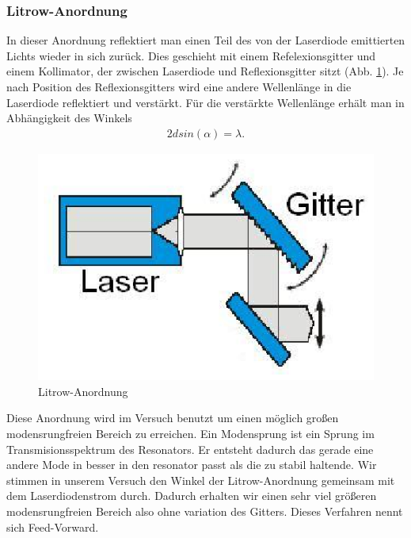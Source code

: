 \documentclass[12pt]{article}
\begin{document}
\subsubsection{Litrow-Anordnung}
In dieser Anordnung reflektiert man einen Teil des von der Laserdiode emittierten Lichts wieder in sich zurück. Dies geschieht mit einem Refelexionsgitter und einem Kollimator, der zwischen Laserdiode und Reflexionsgitter sitzt (Abb. \ref{litrow}). Je nach Position des Reflexionsgitters wird eine andere Wellenlänge in die Laserdiode reflektiert und verstärkt. Für die verstärkte Wellenlänge erhält man in Abhängigkeit des Winkels
\begin{align}
\label{litrowpeak}
 2d sin(\alpha) = \lambda.
\end{align}
\begin{figure}[H]
 \includegraphics[width=0.9\linewidth]{pictures/litrow.eps}
 \caption{Litrow-Anordnung}
 \label{litrow}
\end{figure}
Diese Anordnung wird im Versuch benutzt um einen möglich großen modensrungfreien Bereich zu erreichen. Ein Modensprung ist ein Sprung im Transmisionsspektrum des Resonators. Er entsteht dadurch das gerade eine andere Mode in besser in den resonator passt als die zu stabil haltende. Wir stimmen in unserem Versuch den Winkel der Litrow-Anordnung gemeinsam mit dem Laserdiodenstrom durch. Dadurch erhalten wir einen sehr viel größeren modensrungfreien Bereich also ohne variation des Gitters. Dieses Verfahren nennt sich Feed-Vorward.
\end{document}

